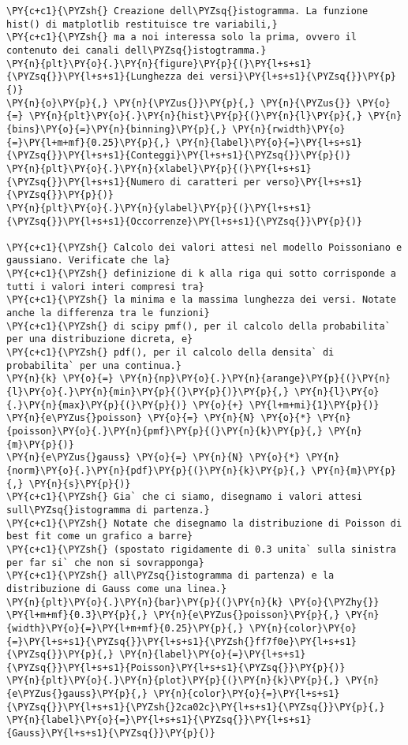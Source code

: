 \begin{Verbatim}[label=\makebox{\href{https://github.com/unipi-physics-labs/lab1-sheets/tree/main/snippy/dad_conteggi.py}{https://github.com/.../dad\_conteggi.py}},commandchars=\\\{\}]
\PY{c+c1}{\PYZsh{} Creazione dell\PYZsq{}istogramma. La funzione hist() di matplotlib restituisce tre variabili,}
\PY{c+c1}{\PYZsh{} ma a noi interessa solo la prima, ovvero il contenuto dei canali dell\PYZsq{}istogtramma.}
\PY{n}{plt}\PY{o}{.}\PY{n}{figure}\PY{p}{(}\PY{l+s+s1}{\PYZsq{}}\PY{l+s+s1}{Lunghezza dei versi}\PY{l+s+s1}{\PYZsq{}}\PY{p}{)}
\PY{n}{o}\PY{p}{,} \PY{n}{\PYZus{}}\PY{p}{,} \PY{n}{\PYZus{}} \PY{o}{=} \PY{n}{plt}\PY{o}{.}\PY{n}{hist}\PY{p}{(}\PY{n}{l}\PY{p}{,} \PY{n}{bins}\PY{o}{=}\PY{n}{binning}\PY{p}{,} \PY{n}{rwidth}\PY{o}{=}\PY{l+m+mf}{0.25}\PY{p}{,} \PY{n}{label}\PY{o}{=}\PY{l+s+s1}{\PYZsq{}}\PY{l+s+s1}{Conteggi}\PY{l+s+s1}{\PYZsq{}}\PY{p}{)}
\PY{n}{plt}\PY{o}{.}\PY{n}{xlabel}\PY{p}{(}\PY{l+s+s1}{\PYZsq{}}\PY{l+s+s1}{Numero di caratteri per verso}\PY{l+s+s1}{\PYZsq{}}\PY{p}{)}
\PY{n}{plt}\PY{o}{.}\PY{n}{ylabel}\PY{p}{(}\PY{l+s+s1}{\PYZsq{}}\PY{l+s+s1}{Occorrenze}\PY{l+s+s1}{\PYZsq{}}\PY{p}{)}

\PY{c+c1}{\PYZsh{} Calcolo dei valori attesi nel modello Poissoniano e gaussiano. Verificate che la}
\PY{c+c1}{\PYZsh{} definizione di k alla riga qui sotto corrisponde a tutti i valori interi compresi tra}
\PY{c+c1}{\PYZsh{} la minima e la massima lunghezza dei versi. Notate anche la differenza tra le funzioni}
\PY{c+c1}{\PYZsh{} di scipy pmf(), per il calcolo della probabilita` per una distribuzione dicreta, e}
\PY{c+c1}{\PYZsh{} pdf(), per il calcolo della densita` di probabilita` per una continua.}
\PY{n}{k} \PY{o}{=} \PY{n}{np}\PY{o}{.}\PY{n}{arange}\PY{p}{(}\PY{n}{l}\PY{o}{.}\PY{n}{min}\PY{p}{(}\PY{p}{)}\PY{p}{,} \PY{n}{l}\PY{o}{.}\PY{n}{max}\PY{p}{(}\PY{p}{)} \PY{o}{+} \PY{l+m+mi}{1}\PY{p}{)}
\PY{n}{e\PYZus{}poisson} \PY{o}{=} \PY{n}{N} \PY{o}{*} \PY{n}{poisson}\PY{o}{.}\PY{n}{pmf}\PY{p}{(}\PY{n}{k}\PY{p}{,} \PY{n}{m}\PY{p}{)}
\PY{n}{e\PYZus{}gauss} \PY{o}{=} \PY{n}{N} \PY{o}{*} \PY{n}{norm}\PY{o}{.}\PY{n}{pdf}\PY{p}{(}\PY{n}{k}\PY{p}{,} \PY{n}{m}\PY{p}{,} \PY{n}{s}\PY{p}{)}
\PY{c+c1}{\PYZsh{} Gia` che ci siamo, disegnamo i valori attesi sull\PYZsq{}istogramma di partenza.}
\PY{c+c1}{\PYZsh{} Notate che disegnamo la distribuzione di Poisson di best fit come un grafico a barre}
\PY{c+c1}{\PYZsh{} (spostato rigidamente di 0.3 unita` sulla sinistra per far si` che non si sovrapponga}
\PY{c+c1}{\PYZsh{} all\PYZsq{}istogramma di partenza) e la distribuzione di Gauss come una linea.}
\PY{n}{plt}\PY{o}{.}\PY{n}{bar}\PY{p}{(}\PY{n}{k} \PY{o}{\PYZhy{}} \PY{l+m+mf}{0.3}\PY{p}{,} \PY{n}{e\PYZus{}poisson}\PY{p}{,} \PY{n}{width}\PY{o}{=}\PY{l+m+mf}{0.25}\PY{p}{,} \PY{n}{color}\PY{o}{=}\PY{l+s+s1}{\PYZsq{}}\PY{l+s+s1}{\PYZsh{}ff7f0e}\PY{l+s+s1}{\PYZsq{}}\PY{p}{,} \PY{n}{label}\PY{o}{=}\PY{l+s+s1}{\PYZsq{}}\PY{l+s+s1}{Poisson}\PY{l+s+s1}{\PYZsq{}}\PY{p}{)}
\PY{n}{plt}\PY{o}{.}\PY{n}{plot}\PY{p}{(}\PY{n}{k}\PY{p}{,} \PY{n}{e\PYZus{}gauss}\PY{p}{,} \PY{n}{color}\PY{o}{=}\PY{l+s+s1}{\PYZsq{}}\PY{l+s+s1}{\PYZsh{}2ca02c}\PY{l+s+s1}{\PYZsq{}}\PY{p}{,} \PY{n}{label}\PY{o}{=}\PY{l+s+s1}{\PYZsq{}}\PY{l+s+s1}{Gauss}\PY{l+s+s1}{\PYZsq{}}\PY{p}{)}


\end{Verbatim}
